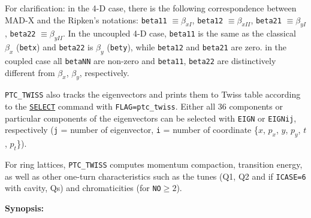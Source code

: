 For clarification: in the 4-D case, there is the following
correspondence between MAD-X and the Ripken's notations:  
\texttt{beta11} $\equiv \beta_{xI}$, 
\texttt{beta12} $\equiv \beta_{xII}$, 
\texttt{beta21} $\equiv \beta_{yI}$, 
\texttt{beta22} $\equiv \beta_{yII}$.
In the uncoupled 4-D case, \texttt{beta11} is the same as the
classical $\beta_x$ (\texttt{betx}) and \texttt{beta22} is $\beta_y$ 
(\texttt{bety}), while \texttt{beta12} and \texttt{beta21} are zero.  
in the coupled case all \texttt{betaNN} are non-zero and \texttt{beta11},
\texttt{beta22} are distinctively different from $\beta_x$, $\beta_y$,
respectively.

\texttt{PTC\_TWISS} also tracks the eigenvectors and prints them to Twiss table
according to the \hyperref[sec:select]{\texttt{SELECT}} command  with
\texttt{FLAG=ptc\_twiss}.  
Either all 36 components or particular components of the eigenvectors
can be selected with \texttt{EIGN} or \texttt{EIGNij}, respectively
(\texttt{j} = number of eigenvector, \texttt{i} = number of coordinate
\{$x$, $p_x$, $y$, $p_y$, $t$, $p_t$\}). 

For ring lattices, \texttt{PTC\_TWISS} computes momentum compaction, transition
energy, as well as other one-turn characteristics such as the tunes
(Q1, Q2 and if \texttt{ICASE=6} with cavity, Qs) and chromaticities (for
\texttt{NO}$\geq 2$).  

\textbf{Synopsis:}

